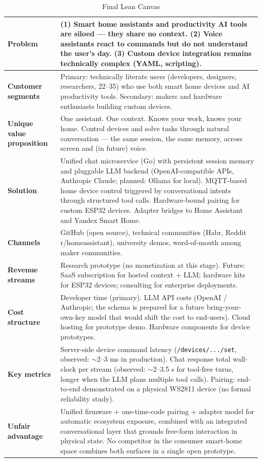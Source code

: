 \documentclass[a4paper,12pt]{article}
\begin{document}
\begin{table}[h]
\centering
\caption{Final Lean Canvas}
\label{tab:canvas}
\small
\begin{tabularx}{\textwidth}{lX}
\toprule
\textbf{Problem} &
(1) Smart home assistants and productivity AI tools are siloed --- they share no context.
(2) Voice assistants react to commands but do not understand the user's day.
(3) Custom device integration remains technically complex (YAML, scripting).
\\ \midrule
\textbf{Customer segments} &
Primary: technically literate users (developers, designers, researchers, 22--35) who use both smart home devices and AI productivity tools.
Secondary: makers and hardware enthusiasts building custom devices.
\\ \midrule
\textbf{Unique value proposition} &
One assistant. One context. Knows your work, knows your home. Control devices and solve tasks through natural conversation --- the same session, the same memory, across screen and (in future) voice.
\\ \midrule
\textbf{Solution} &
Unified chat microservice (Go) with persistent session memory and pluggable LLM backend (OpenAI-compatible APIs, Anthropic Claude; planned: Ollama for local).
MQTT-based home device control triggered by conversational intents through structured tool calls.
Hardware-bound pairing for custom ESP32 devices.
Adapter bridges to Home Assistant and Yandex Smart Home.
\\ \midrule
\textbf{Channels} &
GitHub (open source), technical communities (Habr, Reddit r/homeassistant), university demos, word-of-mouth among maker communities.
\\ \midrule
\textbf{Revenue streams} &
Research prototype (no monetization at this stage). Future: SaaS subscription for hosted context + LLM; hardware kits for ESP32 devices; consulting for enterprise deployments.
\\ \midrule
\textbf{Cost structure} &
Developer time (primary). LLM API costs (OpenAI / Anthropic; the schema is prepared for a future bring-your-own-key model that would shift the cost to end-users). Cloud hosting for prototype demo. Hardware components for device prototypes.
\\ \midrule
\textbf{Key metrics} &
Server-side device command latency (\verb|/devices/.../set|, observed: $\sim$2--3 ms in production).
Chat response total wall-clock per stream (observed: $\sim$2--3.5 s for tool-free turns, longer when the LLM plans multiple tool calls).
Pairing: end-to-end demonstrated on a physical WS2811 device (no formal reliability study).
\\ \midrule
\textbf{Unfair advantage} &
Unified firmware + one-time-code pairing + adapter model for automatic ecosystem exposure, combined with an integrated conversational layer that grounds free-form interaction in physical state. No competitor in the consumer smart-home space combines both surfaces in a single open prototype.
\\ \bottomrule
\end{tabularx}
\end{table}
\end{document}

